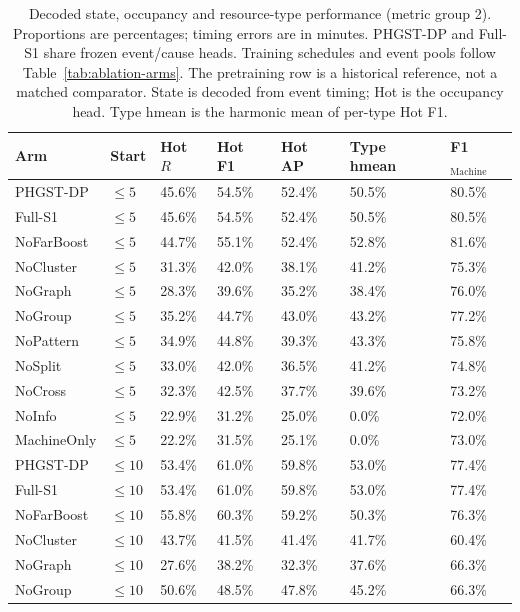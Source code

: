 \begin{table}[p]
\centering
\scriptsize
\setlength{\tabcolsep}{3pt}
\renewcommand{\arraystretch}{1.12}
\caption{Decoded state, occupancy and resource-type performance (metric group 2). Proportions are percentages; timing errors are in minutes. PHGST-DP and Full-S1 share frozen event/cause heads. Training schedules and event pools follow Table~\ref{tab:ablation-arms}. The pretraining row is a historical reference, not a matched comparator. State is decoded from event timing; Hot is the occupancy head. Type hmean is the harmonic mean of per-type Hot F1.}
\label{tab:complete-3-2}
\begin{tabularx}{\textwidth}{@{}lXXXXXX@{}}
\toprule
Arm & Start & Hot $R$ & Hot F1 & Hot AP & Type hmean & F1$_{\mathrm{Machine}}$ \\
\midrule
PHGST-DP & $\le 5$ & 45.6\% & 54.5\% & 52.4\% & 50.5\% & 80.5\% \\
Full-S1 & $\le 5$ & 45.6\% & 54.5\% & 52.4\% & 50.5\% & 80.5\% \\
NoFarBoost & $\le 5$ & 44.7\% & 55.1\% & 52.4\% & 52.8\% & 81.6\% \\
NoCluster & $\le 5$ & 31.3\% & 42.0\% & 38.1\% & 41.2\% & 75.3\% \\
NoGraph & $\le 5$ & 28.3\% & 39.6\% & 35.2\% & 38.4\% & 76.0\% \\
NoGroup & $\le 5$ & 35.2\% & 44.7\% & 43.0\% & 43.2\% & 77.2\% \\
NoPattern & $\le 5$ & 34.9\% & 44.8\% & 39.3\% & 43.3\% & 75.8\% \\
NoSplit & $\le 5$ & 33.0\% & 42.0\% & 36.5\% & 41.2\% & 74.8\% \\
NoCross & $\le 5$ & 32.3\% & 42.5\% & 37.7\% & 39.6\% & 73.2\% \\
NoInfo & $\le 5$ & 22.9\% & 31.2\% & 25.0\% & 0.0\% & 72.0\% \\
MachineOnly & $\le 5$ & 22.2\% & 31.5\% & 25.1\% & 0.0\% & 73.0\% \\
\midrule
PHGST-DP & $\le 10$ & 53.4\% & 61.0\% & 59.8\% & 53.0\% & 77.4\% \\
Full-S1 & $\le 10$ & 53.4\% & 61.0\% & 59.8\% & 53.0\% & 77.4\% \\
NoFarBoost & $\le 10$ & 55.8\% & 60.3\% & 59.2\% & 50.3\% & 76.3\% \\
NoCluster & $\le 10$ & 43.7\% & 41.5\% & 41.4\% & 41.7\% & 60.4\% \\
NoGraph & $\le 10$ & 27.6\% & 38.2\% & 32.3\% & 37.6\% & 66.3\% \\
NoGroup & $\le 10$ & 50.6\% & 48.5\% & 47.8\% & 45.2\% & 66.3\% \\

\end{tabularx}
\end{table}

